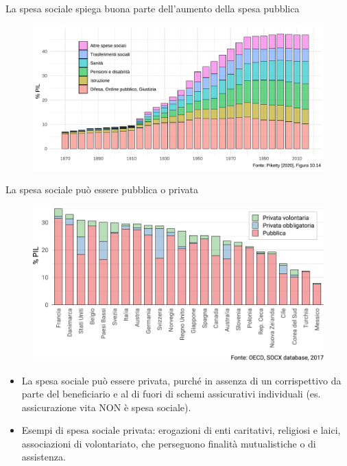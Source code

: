 \documentclass[aspectratio=149,11pt]{beamer}
\begin{document}
\begin{frame}{La spesa sociale spiega buona parte dell'aumento della spesa pubblica}
\begin{figure}[htbp]
\centering
\includegraphics[width=.95\textwidth]{./figure/evoluzione-spesa-Piketty.pdf}
\end{figure}
\end{frame}


\begin{frame}{La spesa sociale può essere pubblica o privata}
\begin{figure}[htbp]
\centering
\includegraphics[width=.85\textwidth]{./figure/spesa-sociale-pubblica-privata-color.pdf}
\end{figure}

\small
\begin{itemize}
\item La spesa sociale può essere privata, purché in assenza di un corrispettivo
da parte del beneficiario e al di fuori di schemi assicurativi individuali
(es. assicurazione vita NON è spesa sociale).
\item Esempi di spesa sociale privata: erogazioni di enti caritativi, religiosi e
laici, associazioni di volontariato, che perseguono finalità mutualistiche o
di assistenza.
\end{itemize}
\end{frame}
\end{document}
